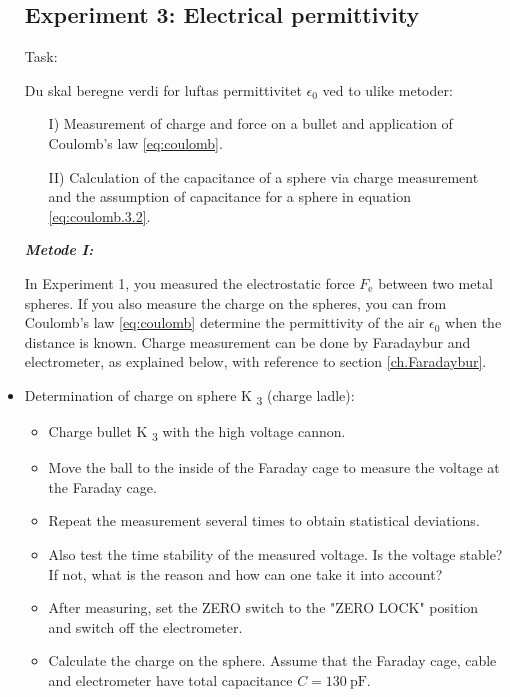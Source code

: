\documentclass[../Elmag-labhefte-2022.tex]{subfiles}
\begin{document}
\begin{itemize}
\subsection{Experiment 3: Electrical permittivity}

Task: \ \
{\itsf Du skal beregne verdi for luftas permittivitet $\epsilon_0$ ved to ulike metoder:

\vspace{-4mm}
\begin{itemize}
    \item [I)] Measurement of charge and force on a bullet and application of Coulomb's law \eqref{eq:coulomb}.
    \item [II)] Calculation of the capacitance of a sphere via charge measurement and the assumption of capacitance for a sphere in equation \eqref{eq:coulomb.3.2}.
\end{itemize}
}

\textbf{\emph{Metode I:}}

In Experiment 1, you measured the electrostatic force $F_\text{e}$ between two metal spheres. If you also measure the charge on the spheres, you can from Coulomb's law \eqref{eq:coulomb} determine the permittivity of the air $\epsilon_0$ when the distance is known. Charge measurement can be done by Faradaybur and electrometer, as explained below, with reference to section \ref{ch.Faradaybur}.


%
    \item Determination of charge on sphere K \textsubscript{3} (charge ladle):
    \vspace{-2mm}
    \begin{itemize}
        \item Charge bullet K \textsubscript{3} with the high voltage cannon.
        \item Move the ball to the inside of the Faraday cage to measure the voltage at the Faraday cage.
        \item Repeat the measurement several times to obtain statistical deviations.
        \item Also test the time stability of the measured voltage. Is the voltage stable? If not, what is the reason and how can one take it into account?
        \item After measuring, set the ZERO switch to the "ZERO LOCK" position and switch off the electrometer.
        \item Calculate the charge on the sphere. Assume that the Faraday cage, cable and electrometer have total capacitance $C = \SI{130}{\pico\farad}$.
    \end{itemize}
\end{itemize}
\end{document}
